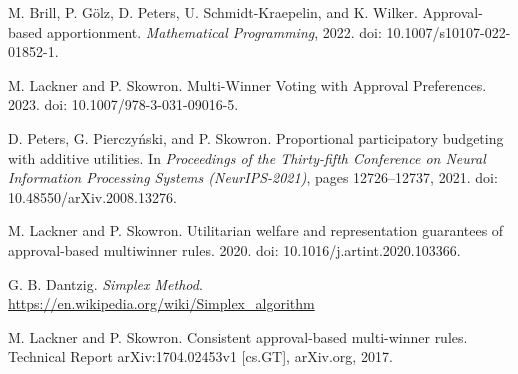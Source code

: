 \documentclass[magisterska,en]{pracamgr}
\begin{document}
\begin{thebibliography}{99}
 M. Brill, P. Gölz, D. Peters, U. Schmidt-Kraepelin, and K. Wilker. Approval-based apportionment.
\textit{Mathematical Programming}, 2022.
doi: 10.1007/s10107-022-01852-1.

 M. Lackner and P. Skowron. Multi-Winner Voting with Approval Preferences.
2023.
doi: 10.1007/978-3-031-09016-5.

 D. Peters, G. Pierczyński, and P. Skowron. Proportional participatory budgeting with additive utilities.
In \textit{Proceedings of the Thirty-fifth Conference on Neural Information Processing Systems (NeurIPS-2021)}, pages 12726--12737, 2021.
doi: 10.48550/arXiv.2008.13276.

 M. Lackner and P. Skowron. Utilitarian welfare and representation guarantees of approval-based multiwinner rules.
2020.
doi: 10.1016/j.artint.2020.103366.

 G. B. Dantzig. \textit{Simplex Method}.
\url{https://en.wikipedia.org/wiki/Simplex_algorithm}

 M. Lackner and P. Skowron. Consistent approval-based multi-winner rules.
Technical Report
arXiv:1704.02453v1 [cs.GT], arXiv.org, 2017.

\end{thebibliography}
\end{document}
